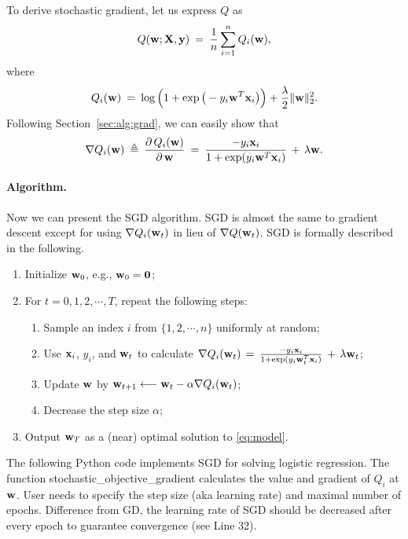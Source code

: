 \documentclass[11pt]{article}
\numberwithin{equation}{section}
\def\w{{\bf w}}
\def\X{{\bf X}}
\def\x{{\bf x}}
\def\y{{\bf y}}
\def\0{{\bf 0}}
\begin{document}
To derive stochastic gradient, let us express $Q $ as 
\begin{equation}\label{eq:sgrad1}
Q (\w; \X, \y) \: = \: \frac{1}{n} \sum_{i=1}^n Q_i(\w)  ,
\end{equation}
where
\begin{equation*}
Q_i (\w) \: = \: \log \Big( 1 + \exp \big( - y_i \w^T \x_i \big) \Big) + \frac{\lambda}{2} \|\w \|_2^2 .
\end{equation*}
Following Section~\ref{sec:alg:grad}, we can easily show that
\begin{equation} \label{eq:sgrad2}
\nabla Q_i (\w) \: \triangleq \:
\frac{ \partial \, Q_i (\w ) }{\partial \, \w }
\: = \:
\frac{ - y_i \x_i }{1+\exp({y_i \w^T \x_i})} \, + \, \lambda \w .
\end{equation}


\paragraph{Algorithm.}
Now we can present the SGD algorithm.
SGD is almost the same to gradient descent except for using $\nabla Q_i (\w_t)$ in lieu of $\nabla Q (\w_t)$.
SGD is formally described in the following.
\begin{enumerate}
	\item 
	Initialize $\w_0$, e.g., $\w_0 = \0$;
	\item
	For $t = 0, 1, 2, \cdots , T$, repeat the following steps:
	\begin{enumerate}
		\item
		Sample an index $i$ from $\{ 1 , 2, \cdots , n \}$ uniformly at random;
		\item 
		Use $\x_i$, $y_i$, and $\w_t$ to calculate
		$\nabla Q_i (\w_t) \, = \, \frac{-  y_i \x_i }{1+\exp({y_i \w_t^T \x_i})} \, + \, \lambda \w_t $;
		\item
		Update $\w$ by
		$\w_{t+1} \longleftarrow \w_t - \alpha \nabla Q_i (\w_t)$;
		\item
		Decrease the step size $\alpha$;
	\end{enumerate}
	\item
	Output $\w_{T}$ as a (near) optimal solution to \eqref{eq:model}.
\end{enumerate}


The following Python code implements SGD for solving logistic regression.
The function \textsf{stochastic\_objective\_gradient} calculates the value and gradient of $Q_i$ at $\w$.
User needs to specify the step size (aka learning rate) and maximal number of  epochs.
Difference from GD, the learning rate of SGD should be decreased after every epoch to guarantee convergence (see Line 32).
\end{document}
